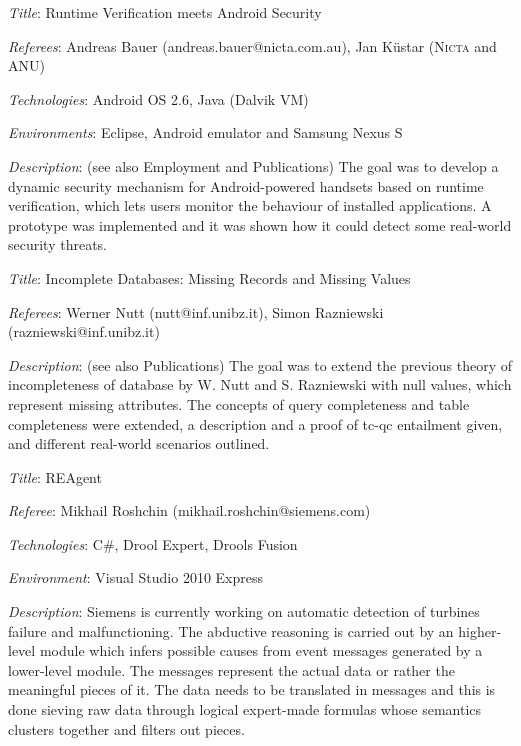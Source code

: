 \documentclass[letterpaper]{article}
\renewenvironment{itemize}{
  \begin{list}{}{
    \setlength{\leftmargin}{1.5em}
  }
}{
  \end{list}
}
\newenvironment{itemize1}{
  \begin{list}{}{
    \setlength{\leftmargin}{0em}
  }
}{
  \end{list}
}
\begin{document}
\begin{itemize1}
\bigskip
\item
\begin{itemize}
\item {\it Title}: Runtime Verification meets Android Security 
\item {\it Referees}: Andreas Bauer (andreas.bauer@nicta.com.au), Jan K\"{u}star (\textsc{Nicta} and ANU)
\item {\it Technologies}: Android OS 2.6, Java (Dalvik VM)
\item {\it Environments}: Eclipse, Android emulator and Samsung Nexus S
\item {\it Description}: (see also Employment and Publications) The goal was to develop a dynamic security mechanism for Android-powered handsets based on runtime verification, which lets users monitor the behaviour of installed applications. A prototype was implemented and it was shown how it could detect some real-world security threats.
\end{itemize}

\bigskip
\item
\begin{itemize}
\item {\it Title}: Incomplete Databases: Missing Records and Missing Values
\item {\it Referees}: Werner Nutt (nutt@inf.unibz.it), Simon Razniewski (razniewski@inf.unibz.it)
\item {\it Description}: (see also Publications) The goal was to extend the previous theory of incompleteness of database by W. Nutt and S. Razniewski with null values, which represent missing attributes. The concepts of query completeness and table completeness were extended, a description and a proof of tc-qc entailment given, and different real-world scenarios outlined. 
\end{itemize}

\bigskip
\item
\begin{itemize}
\item {\it Title}: REAgent
\item {\it Referee}: Mikhail Roshchin (mikhail.roshchin@siemens.com)
\item {\it Technologies}: C\#, Drool Expert, Drools Fusion
\item {\it Environment}: Visual Studio 2010 Express
\item {\it Description}: Siemens is currently working on automatic detection of turbines failure and malfunctioning. The abductive reasoning is carried out by an higher-level module which infers possible causes from event messages generated by a lower-level module. The messages represent the actual data or rather the meaningful pieces of it. The data needs to be translated in messages and this is done sieving raw data through logical expert-made formulas whose semantics clusters together and filters out pieces. 
\medskip


\end{itemize}
\end{itemize1}
\end{document}
